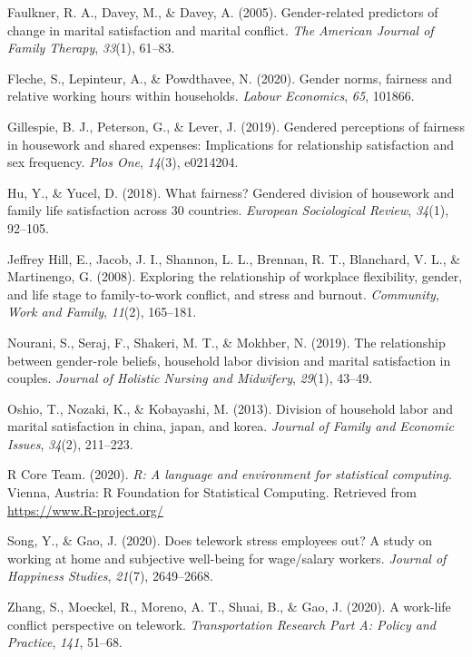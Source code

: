\documentclass[
  english,
  man]{apa6}
\newlength{\cslhangindent}
\newenvironment{cslreferences}%
  {\setlength{\parindent}{0pt}%
  \everypar{\setlength{\hangindent}{\cslhangindent}}\ignorespaces}%
  {\par}
\begin{document}
\begin{cslreferences}
\leavevmode\hypertarget{ref-faulkner2005gender}{}%
Faulkner, R. A., Davey, M., \& Davey, A. (2005). Gender-related predictors of change in marital satisfaction and marital conflict. \emph{The American Journal of Family Therapy}, \emph{33}(1), 61--83.

\leavevmode\hypertarget{ref-fleche2020gender}{}%
Fleche, S., Lepinteur, A., \& Powdthavee, N. (2020). Gender norms, fairness and relative working hours within households. \emph{Labour Economics}, \emph{65}, 101866.

\leavevmode\hypertarget{ref-gillespie2019gendered}{}%
Gillespie, B. J., Peterson, G., \& Lever, J. (2019). Gendered perceptions of fairness in housework and shared expenses: Implications for relationship satisfaction and sex frequency. \emph{Plos One}, \emph{14}(3), e0214204.

\leavevmode\hypertarget{ref-hu2018fairness}{}%
Hu, Y., \& Yucel, D. (2018). What fairness? Gendered division of housework and family life satisfaction across 30 countries. \emph{European Sociological Review}, \emph{34}(1), 92--105.

\leavevmode\hypertarget{ref-jeffrey2008exploring}{}%
Jeffrey Hill, E., Jacob, J. I., Shannon, L. L., Brennan, R. T., Blanchard, V. L., \& Martinengo, G. (2008). Exploring the relationship of workplace flexibility, gender, and life stage to family-to-work conflict, and stress and burnout. \emph{Community, Work and Family}, \emph{11}(2), 165--181.

\leavevmode\hypertarget{ref-nourani2019relationship}{}%
Nourani, S., Seraj, F., Shakeri, M. T., \& Mokhber, N. (2019). The relationship between gender-role beliefs, household labor division and marital satisfaction in couples. \emph{Journal of Holistic Nursing and Midwifery}, \emph{29}(1), 43--49.

\leavevmode\hypertarget{ref-oshio2013division}{}%
Oshio, T., Nozaki, K., \& Kobayashi, M. (2013). Division of household labor and marital satisfaction in china, japan, and korea. \emph{Journal of Family and Economic Issues}, \emph{34}(2), 211--223.

\leavevmode\hypertarget{ref-R-base}{}%
R Core Team. (2020). \emph{R: A language and environment for statistical computing}. Vienna, Austria: R Foundation for Statistical Computing. Retrieved from \url{https://www.R-project.org/}

\leavevmode\hypertarget{ref-song2020does}{}%
Song, Y., \& Gao, J. (2020). Does telework stress employees out? A study on working at home and subjective well-being for wage/salary workers. \emph{Journal of Happiness Studies}, \emph{21}(7), 2649--2668.

\leavevmode\hypertarget{ref-zhang2020work}{}%
Zhang, S., Moeckel, R., Moreno, A. T., Shuai, B., \& Gao, J. (2020). A work-life conflict perspective on telework. \emph{Transportation Research Part A: Policy and Practice}, \emph{141}, 51--68.
\end{cslreferences}

\endgroup
\end{document}
